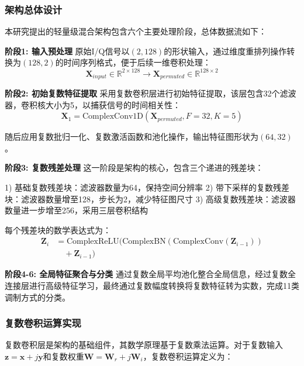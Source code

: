 \documentclass[conference]{IEEEtran}
\begin{document}
\subsubsection{架构总体设计}

本研究提出的轻量级混合架构包含六个主要处理阶段，总体数据流如下：

\textbf{阶段1: 输入预处理}
原始I/Q信号以$(2, 128)$的形状输入，通过维度重排列操作转换为$(128, 2)$的时间序列格式，便于后续一维卷积处理：
\begin{equation}
\mathbf{X}_{input} \in \mathbb{R}^{2 \times 128} \rightarrow \mathbf{X}_{permuted} \in \mathbb{R}^{128 \times 2}
\end{equation}

\textbf{阶段2: 初始复数特征提取}
采用复数卷积层进行初始特征提取，该层包含32个滤波器，卷积核大小为5，以捕获信号的时间相关性：
\begin{equation}
\mathbf{X}_1 = \text{ComplexConv1D}(\mathbf{X}_{permuted}, F=32, K=5)
\end{equation}

随后应用复数批归一化、复数激活函数和池化操作，输出特征图形状为$(64, 32)$。

\textbf{阶段3: 复数残差处理}
这一阶段是架构的核心，包含三个递进的残差块：

1) 基础复数残差块：滤波器数量为64，保持空间分辨率
2) 带下采样的复数残差块：滤波器数量增至128，步长为2，减少特征图尺寸
3) 高级复数残差块：滤波器数量进一步增至256，采用三层卷积结构

每个残差块的数学表达式为：
\begin{equation}
\begin{aligned}
\mathbf{Z}_i &= \text{ComplexReLU}(\text{ComplexBN}(\text{ComplexConv}(\mathbf{Z}_{i-1})) \\
&\quad + \mathbf{Z}_{i-1})
\end{aligned}
\end{equation}

\textbf{阶段4-6: 全局特征聚合与分类}
通过复数全局平均池化整合全局信息，经过复数全连接层进行高级特征学习，最终通过复数幅度转换将复数特征转为实数，完成11类调制方式的分类。

\subsubsection{复数卷积运算实现}

复数卷积层是架构的基础组件，其数学原理基于复数乘法运算。对于复数输入$\mathbf{z} = \mathbf{x} + j\mathbf{y}$和复数权重$\mathbf{W} = \mathbf{W}_r + j\mathbf{W}_i$，复数卷积运算定义为：
\end{document}
